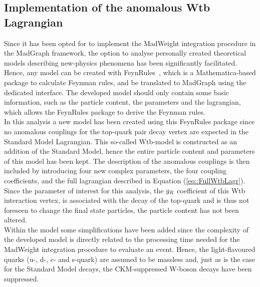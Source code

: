 \subsection{Implementation of the anomalous Wtb Lagrangian} \label{subsec::FRModel}

Since it has been opted for to implement the MadWeight integration procedure in the MadGraph framework, the option to analyse personally created theoretical models describing new-physics phenomena has been significantly facilitated.
Hence, any model can be created with FeynRules~\cite{FeynRules}, which is a Mathematica-based package to calculate Feynman rules, and be translated to MadGraph using the dedicated interface.
The developed model should only contain some basic information, such as the particle content, the parameters and the lagrangian, which allows the FeynRules package to derive the Feynman rules.
\\

In this analysis a new model has been created using this FeynRules package since no anomalous couplings for the top-quark pair decay vertex are expected in the Standard Model Lagrangian.
This so-called Wtb-model is constructed as an addition of the Standard Model, hence the entire particle content and parameters of this model has been kept.
The description of the anomalous couplings is then included by introducing four new complex parameters, the four coupling coefficients, and the full lagrangian described in Equation (\ref{eq::FullWtbLagr}).
Since the parameter of interest for this analysis, the $g_{R}$ coefficient of this Wtb interaction vertex, is associated with the decay of the top-quark and is thus not foreseen to change the final state particles, the particle content has not been altered.
\\
Within the model some simplifications have been added since the complexity of the developed model is directly related to the processing time needed for the MadWeight integration procedure to evaluate an event. %
Hence, the light-flavoured quarks (u-, d-, c- and s-quark) are assumed to be massless and, just as is the case for the Standard Model decays, the CKM-suppressed W-boson decays have been suppressed.
\\

